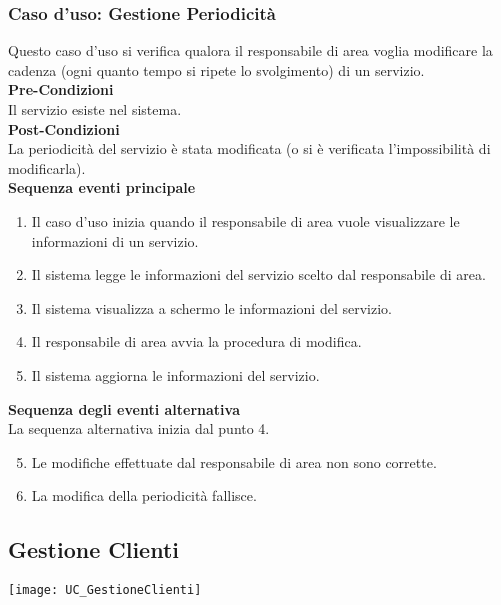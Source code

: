 \documentclass[green, fancy, 11pt]{elegantbook}
\begin{document}
\subsubsection{Caso d'uso: Gestione Periodicità}
Questo caso d’uso si verifica qualora il responsabile di area voglia modificare la cadenza (ogni quanto tempo si ripete lo svolgimento) di un servizio.\\
\textbf{Pre-Condizioni}\\
Il servizio esiste nel sistema.\\
\textbf{Post-Condizioni}\\
La periodicità del servizio è stata modificata (o si è verificata l’impossibilità di modificarla).\\
\textbf{Sequenza eventi principale}
\begin{enumerate}
	\item Il caso d’uso inizia quando il responsabile di area vuole visualizzare le informazioni di un servizio.
	\item Il sistema legge le informazioni del servizio scelto dal responsabile di area.
	\item Il sistema visualizza a schermo le informazioni del servizio.
	\item Il responsabile di area avvia la procedura di modifica.
	\item Il sistema aggiorna le informazioni del servizio.
\end{enumerate}
\textbf{Sequenza degli eventi alternativa}\\
La sequenza alternativa inizia dal punto 4.
\begin{enumerate}
	\setcounter{enumi}{4}
	\item Le modifiche effettuate dal responsabile di area non sono corrette.
	\item La modifica della periodicità fallisce.
\end{enumerate}
\newpage

\subsection{Gestione Clienti}
\texttt{[image: UC\_GestioneClienti]}
\end{document}
